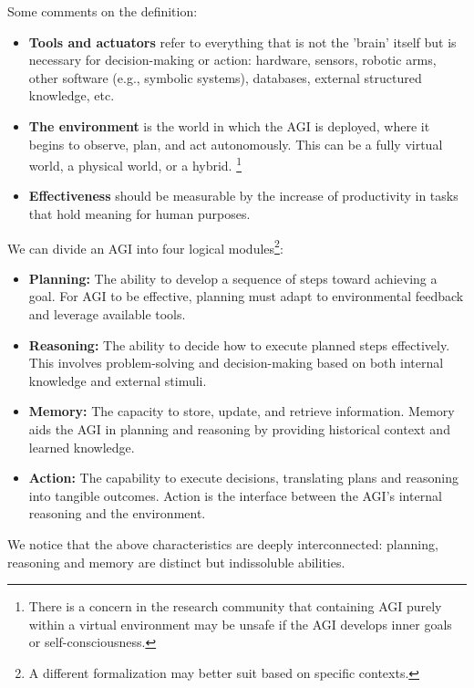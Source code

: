 Some comments on the definition:
\begin{itemize}
    \item \textbf{Tools and actuators} refer to everything that is not the 'brain' itself but is necessary for decision-making or action: hardware, sensors, robotic arms, other software (e.g., symbolic systems), databases, external structured knowledge, etc.
    \item \textbf{The environment} is the world in which the AGI is deployed, where it begins to observe, plan, and act autonomously. This can be a fully virtual world, a physical world, or a hybrid. \footnote{There is a concern in the research community that containing AGI purely within a virtual environment may be unsafe if the AGI develops inner goals or self-consciousness.}
    \item \textbf{Effectiveness} should be measurable by the increase of productivity in tasks that hold meaning for human purposes.
\end{itemize}

We can divide an AGI into four logical modules\footnote{A different formalization may better suit based on specific contexts.}: 
\begin{itemize}
    \item \textbf{Planning:} The ability to develop a sequence of steps toward achieving a goal. For AGI to be effective, planning must adapt to environmental feedback and leverage available tools.
    \item \textbf{Reasoning:} The ability to decide how to execute planned steps effectively. This involves problem-solving and decision-making based on both internal knowledge and external stimuli.
    \item \textbf{Memory:} The capacity to store, update, and retrieve information. Memory aids the AGI in planning and reasoning by providing historical context and learned knowledge.
    \item \textbf{Action:} The capability to execute decisions, translating plans and reasoning into tangible outcomes. Action is the interface between the AGI's internal reasoning and the environment.
\end{itemize}
We notice that the above characteristics are deeply interconnected: planning, reasoning and memory are distinct but indissoluble abilities.

